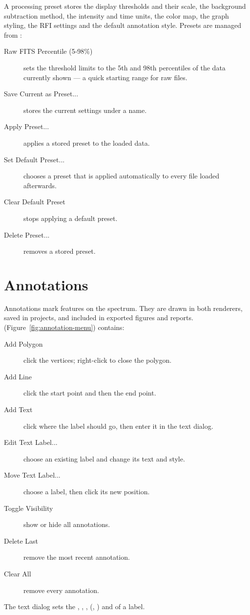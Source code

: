 A processing preset stores the display thresholds and their scale, the background
subtraction method, the intensity and time units, the color map, the graph styling, the
RFI settings and the default annotation style. Presets are managed from
:
\begin{description}
  \item[Raw FITS Percentile (5-98\%)] sets the threshold limits to the 5th and 98th
    percentiles of the data currently shown --- a quick starting range for raw files.
  \item[Save Current as Preset...] stores the current settings under a name.
  \item[Apply Preset...] applies a stored preset to the loaded data.
  \item[Set Default Preset...] chooses a preset that is applied automatically to every
    file loaded afterwards.
  \item[Clear Default Preset] stops applying a default preset.
  \item[Delete Preset...] removes a stored preset.
\end{description}

\section{Annotations}
\label{sec:annotations}

Annotations mark features on the spectrum. They are drawn in both renderers, saved in
projects, and included in exported figures and reports. 
(Figure~\ref{fig:annotation-menu}) contains:
\begin{description}
  \item[Add Polygon] click the vertices; right-click to close the polygon.
  \item[Add Line] click the start point and then the end point.
  \item[Add Text] click where the label should go, then enter it in the text dialog.
  \item[Edit Text Label...] choose an existing label and change its text and style.
  \item[Move Text Label...] choose a label, then click its new position.
  \item[Toggle Visibility] show or hide all annotations.
  \item[Delete Last] remove the most recent annotation.
  \item[Clear All] remove every annotation.
\end{description}
The text dialog sets the , , , 
(, ) and  of a label.

